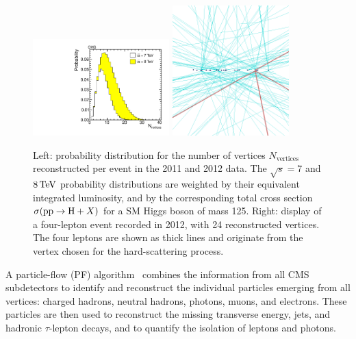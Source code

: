 \documentclass[11pt,twoside,a4paper,cmspaper,final,collab]{cms-tdr}
\begin{document}
\begin{figure}[htb]
\begin{center}
\includegraphics[width=0.47\textwidth]{figures/reconstruction/vertices.pdf}
\hspace{0.5cm}
\includegraphics[width=0.4\textwidth]{figures/reconstruction/vertex_display.png}
\end{center}
\caption{Left: probability distribution for the number of vertices $N_\text{vertices}$ reconstructed per event in the 2011 and 2012 data.
The $\sqrt{s}=7$ and $8\,\text{Te\hspace{-.08em}V}$ probability distributions are weighted by their equivalent integrated luminosity, and by the corresponding total cross section $\sigma(\mathrm{p}\mathrm{p} \to \mathrm{H}+X)$ for a SM Higgs boson of mass 125\GeV.
Right: display of a four-lepton event recorded in 2012, with 24 reconstructed vertices.
The four leptons are shown as thick lines and originate from the vertex chosen for the hard-scattering process.}
\label{fig:reconstruction_vertices}
\end{figure}

A particle-flow (PF) algorithm~\cite{CMS-PAS-PFT-09-001, CMS-PAS-PFT-10-002} combines the information
 from all CMS subdetectors to identify and reconstruct the individual particles emerging from all vertices:
charged hadrons, neutral hadrons, photons, muons, and electrons.
These particles are then used to reconstruct the missing transverse
energy,
jets, and hadronic $\tau$-lepton decays,
and to quantify the isolation of leptons and photons.
\end{document}
